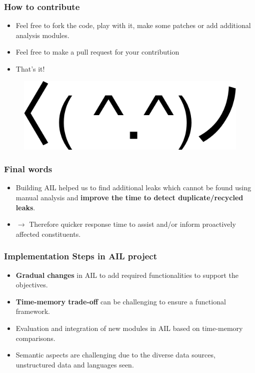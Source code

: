 \documentclass[aspectratio=169]{beamer}
\begin{document}
\begin{frame}
\frametitle{How to contribute}
    \begin{itemize}
        \item Feel free to fork the code, play with it, make some patches or add additional analysis modules.
        \pause
        \item Feel free to make a pull request for your contribution
        \pause
        \item That's it!
    \end{itemize}
    \begin{figure}
        \includegraphics[scale=0.2]{images/dancing.png}
    \end{figure}
\end{frame}



\begin{frame}
   \frametitle{Final words}
   \begin{itemize}
        \item Building AIL helped us to find additional leaks which cannot be found using manual analysis and {\bf improve the time to detect duplicate/recycled leaks}.
            \vskip0.5cm
        \item[] $\rightarrow$ Therefore quicker response time to assist and/or inform proactively affected constituents.
   \end{itemize}
\end{frame}

\begin{frame}
    \frametitle{Implementation Steps in AIL project}
    \begin{itemize}
            \item {\bf Gradual changes} in AIL to add required functionalities to support the objectives.
            \item {\bf Time-memory trade-off} can be challenging to ensure a functional framework.
            \item Evaluation and integration of new modules in AIL based on time-memory comparisons.
            \item Semantic aspects are challenging due to the diverse data sources, unstructured data and languages seen.
    \end{itemize}
\end{frame}
\end{document}

